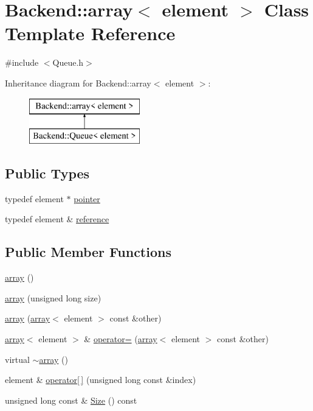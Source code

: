 \hypertarget{class_backend_1_1array}{\section{Backend\+:\+:array$<$ element $>$ Class Template Reference}
\label{class_backend_1_1array}
}


{\ttfamily \#include $<$Queue.\+h$>$}

Inheritance diagram for Backend\+:\+:array$<$ element $>$\+:\begin{figure}[H]
\begin{center}
\leavevmode
\includegraphics[height=2.000000cm]{class_backend_1_1array}
\end{center}
\end{figure}
\subsection*{Public Types}
\begin{DoxyCompactItemize}
\item 
typedef element $\ast$ \hyperlink{class_backend_1_1array_a6d8785dc8b979153ef122f4e3bad1408}{pointer}
\item 
typedef element \& \hyperlink{class_backend_1_1array_aa98075b8d7a4e63ea919ee9d1d4df4a9}{reference}
\end{DoxyCompactItemize}
\subsection*{Public Member Functions}
\begin{DoxyCompactItemize}
\item 
\hyperlink{class_backend_1_1array_a66b527d78881f22d8b8508492f255122}{array} ()
\item 
\hyperlink{class_backend_1_1array_aea145bb4183732b07f1ea2c5ef74406e}{array} (unsigned long size)
\item 
\hyperlink{class_backend_1_1array_ac15cb5df923a27aae58573b2a798a564}{array} (\hyperlink{class_backend_1_1array}{array}$<$ element $>$ const \&other)
\item 
\hyperlink{class_backend_1_1array}{array}$<$ element $>$ \& \hyperlink{class_backend_1_1array_abab978602a61af66f73e4951e5779554}{operator=} (\hyperlink{class_backend_1_1array}{array}$<$ element $>$ const \&other)
\item 
virtual \hyperlink{class_backend_1_1array_af036a9cb5baeb7acdda453ffc25e8b5f}{$\sim$array} ()
\item 
element \& \hyperlink{class_backend_1_1array_a906073a0b37d9abef728f2c188e73a5a}{operator\mbox{[}$\,$\mbox{]}} (unsigned long const \&index)
\item 
unsigned long const \& \hyperlink{class_backend_1_1array_a7b74d2da9eacbeea96b1661962a03970}{Size} () const 
\end{DoxyCompactItemize}

